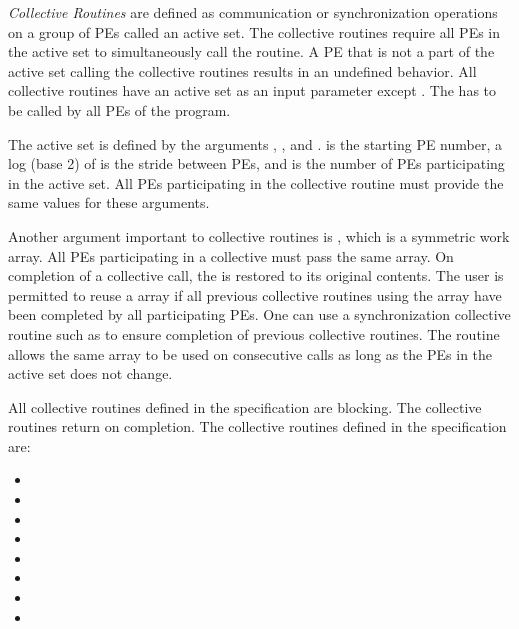 \emph{Collective Routines} are defined as communication or synchronization
operations on a group of \acp{PE} called an active set. The collective
routines require all \acp{PE} in the active set to simultaneously call the
routine.  A \ac{PE} that is not a part of the active set calling the collective
routines results in an undefined behavior.  All collective routines have an
active set as an input parameter except . 
The  has to be called by all \acp{PE} of the 
\openshmem program. 

The active set is defined by the arguments , ,
and .   is the starting \ac{PE} number, a log (base
2) of  is the stride between \acp{PE}, and  is
the number of \acp{PE} participating in the active set.  All \acp{PE}
participating in the collective routine must provide the same values for these
arguments. 
 
Another argument important to collective routines is , which is a
symmetric work array.  All \acp{PE} participating in a collective must pass the
same  array.  On completion of a collective call, the  is
restored to its original contents.  The user is permitted to reuse a 
array if all previous collective routines using the  array have been
completed by all participating \acp{PE}.  One can use a synchronization
collective routine such as \barrier to ensure completion of previous collective
routines. The  routine allows the same  array to
be used on consecutive calls as long as the \acp{PE} in the active set does not change. 

All collective routines defined in the specification are blocking.  The
collective routines return on completion.  The collective routines defined in
the \openshmem specification are:

\begin{itemize}
\item[] \broadcast 
\item[] \barrier
\item[] \barrierall
\item[] \collect
\item[] \fcollect
\item[] \reduction
\item[] \alltoall
\item[] \alltoalls
\end{itemize} 
